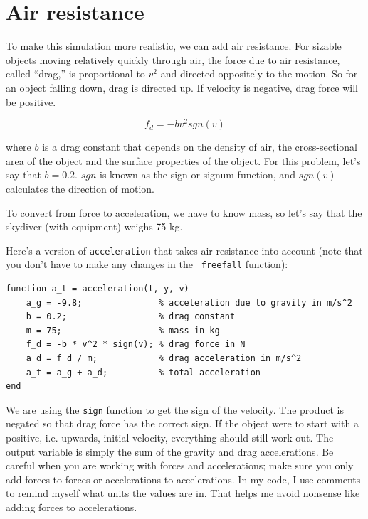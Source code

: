 \documentclass[
]{book}
\begin{document}
\section{Air resistance}
\label{sect:air_resistance}

To make this simulation more realistic, we can add air resistance.
For sizable objects moving relatively quickly through air, the force due to air
resistance, called ``drag,'' is proportional to $v^2$ and directed
oppositely to the motion.  So for an object falling down, drag is
directed up.  If velocity is negative, drag force will be positive.

\begin{equation}\label{eq:simpledrag}
    f_{d} = - b v^2 sgn(v)
\end{equation}

where $b$ is a drag constant that depends on the density of
air, the cross-sectional area of the object and the surface properties
of the object.  For this problem, let's say that $b = 0.2$.  $sgn$ is
known as the sign or signum function, and $sgn(v)$ calculates the
direction of motion.

To convert from force to acceleration, we have to know mass, so let's
say that the skydiver (with equipment) weighs 75 kg.

Here's a version of {\tt acceleration} that takes air resistance into
account (note that you don't have to make any changes in the {\tt
freefall} function):

\begin{verbatim}
function a_t = acceleration(t, y, v)
    a_g = -9.8;               % acceleration due to gravity in m/s^2
    b = 0.2;                  % drag constant
    m = 75;                   % mass in kg
    f_d = -b * v^2 * sign(v); % drag force in N
    a_d = f_d / m;            % drag acceleration in m/s^2
    a_t = a_g + a_d;          % total acceleration
end
\end{verbatim}

We are using the {\tt sign} function to get the sign of the velocity.  The 
product is negated so that drag force has the correct sign.  If the object
were to start with a positive, i.e. upwards, initial velocity, everything 
should still work out.   
The output variable is simply the sum of the gravity and drag accelerations.
Be careful when you are working with forces and accelerations; make sure
you only add forces to forces or accelerations to accelerations.  In my
code, I use comments to remind myself what units the values are in.
That helps me avoid nonsense like adding forces to accelerations.
\end{document}
